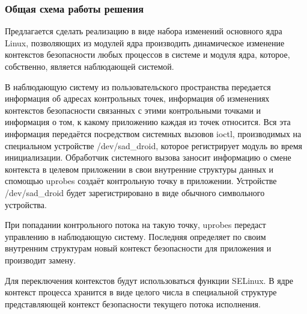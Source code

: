 \subsubsection{Общая схема работы решения}

Предлагается сделать реализацию в виде набора изменений основного ядра
Linux, позволяющих из модулей ядра производить динамическое изменение
контекстов безопасности любых процессов в системе и модуля ядра,
которое, собственно, является наблюдающей системой. 

В наблюдающую систему из пользовательского пространства передается
информация об адресах контрольных точек, информация об изменениях
контекстов безопасности связанных с этими контрольными точками и
информация о том, к какому приложению каждая из точек относится. Вся эта
информация передаётся посредством системных вызовов ioctl, производимых
на специальном устройстве /dev/sad\_droid, которое регистрирует модуль во
время инициализации. Обработчик системного вызова заносит информацию о
смене контекста в целевом приложении в свои внутренние структуры данных
и спомощью uprobes создаёт контрольную точку в приложении.  Устройстве
/dev/sad\_droid будет зарегистрировано в виде обычного символьного устройства.

При попадании контрольного потока на такую точку, uprobes передаст
управлению в наблюдающую систему. Последняя определяет по своим
внутренним структурам новый контекст безопасности для приложения и
производит замену. 

Для переключения контекстов будут использоваться функции SELinux. В ядре
контекст процесса хранится в виде целого числа в специальной структуре
представляющей контекст безопасности текущего потока исполнения.

